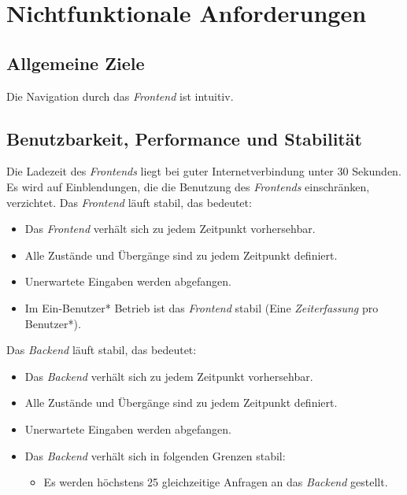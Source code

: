 \section{Nichtfunktionale Anforderungen}

\subsection{Allgemeine Ziele}
\begin{requirements}
     Die Navigation durch das \emph{Frontend} ist intuitiv.
\end{requirements}

\subsection{Benutzbarkeit, Performance und Stabilität}
\begin{requirements}
     Die Ladezeit des \emph{Frontends} liegt bei guter Internetverbindung unter 30 Sekunden.
     Es wird auf Einblendungen, die die Benutzung des \emph{Frontends} einschränken, verzichtet.
     Das \emph{Frontend} läuft stabil, das bedeutet:
     \begin{itemize}
        \item Das \emph{Frontend} verhält sich zu jedem Zeitpunkt vorhersehbar.
        \item Alle Zustände und Übergänge sind zu jedem Zeitpunkt definiert.
        \item Unerwartete Eingaben werden abgefangen.
        \item Im Ein-Benutzer* Betrieb ist das \emph{Frontend} stabil (Eine \emph{Zeiterfassung} pro Benutzer*).
     \end{itemize}
      Das \emph{Backend} läuft stabil, das bedeutet:
          \begin{itemize}
             \item Das \emph{Backend} verhält sich zu jedem Zeitpunkt vorhersehbar.
             \item Alle Zustände und Übergänge sind zu jedem Zeitpunkt definiert.
             \item Unerwartete Eingaben werden abgefangen.
             \item Das \emph{Backend} verhält sich in folgenden Grenzen stabil:
             \begin{itemize}
                 \item Es werden höchstens 25 gleichzeitige Anfragen an das \emph{Backend} gestellt.
             \end{itemize}
          \end{itemize}
\end{requirements}

